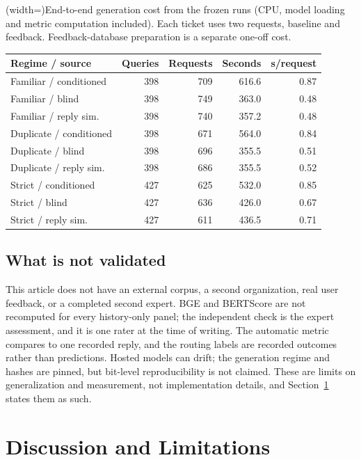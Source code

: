 \documentclass{ieeeaccess}
\begin{document}
\Table[!btp](width=\textwidth){End-to-end generation cost from the frozen runs
(CPU, model loading and metric computation included). Each ticket uses two
requests, baseline and feedback. Feedback-database preparation is a separate
one-off cost.\label{tab:cost}}{
\begin{tabular}{@{}lrrrr@{}}
\toprule
Regime / source & Queries & Requests & Seconds & s/request \\
\midrule
Familiar / conditioned    & 398 & 709 & 616.6 & 0.87 \\
Familiar / blind          & 398 & 749 & 363.0 & 0.48 \\
Familiar / reply sim.     & 398 & 740 & 357.2 & 0.48 \\
Duplicate / conditioned   & 398 & 671 & 564.0 & 0.84 \\
Duplicate / blind         & 398 & 696 & 355.5 & 0.51 \\
Duplicate / reply sim.    & 398 & 686 & 355.5 & 0.52 \\
Strict / conditioned      & 427 & 625 & 532.0 & 0.85 \\
Strict / blind            & 427 & 636 & 426.0 & 0.67 \\
Strict / reply sim.       & 427 & 611 & 436.5 & 0.71 \\
\bottomrule
\end{tabular}}

\subsection{What is not validated}
This article does not have an external corpus, a second organization, real user
feedback, or a completed second expert. BGE and BERTScore are not recomputed for
every history-only panel; the independent check is the expert assessment, and it is one
rater at the time of writing. The automatic metric compares to one recorded reply,
and the routing labels are recorded outcomes rather than predictions. Hosted models
can drift; the generation regime and hashes are pinned, but bit-level
reproducibility is not claimed. These are limits on generalization and measurement,
not implementation details, and Section~\ref{sec:discussion} states them as such.


\section{Discussion and Limitations}
\label{sec:discussion}
\end{document}
